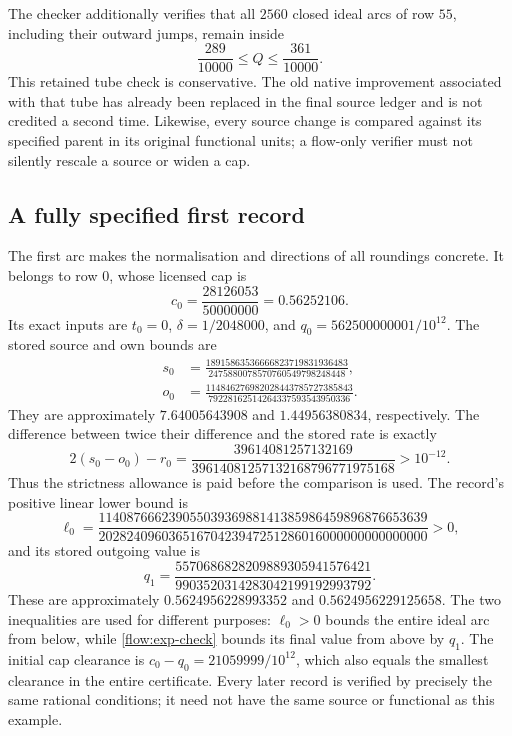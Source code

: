 \documentclass[11pt,a4paper]{article}
\theoremstyle{definition}
\theoremstyle{remark}
\begin{document}
The checker additionally verifies that all $2560$ closed ideal arcs of
row $55$, including their outward jumps, remain inside
\[
 \frac{289}{10000}\leq Q\leq\frac{361}{10000}.
\]
This retained tube check is conservative.  The old native improvement
associated with that tube has already been replaced in the final source
ledger and is not credited a second time.  Likewise, every source
change is compared against its specified parent in its original
functional units; a flow-only verifier must not silently rescale a source
or widen a cap.

\subsection{A fully specified first record}
\label{flow:first-record}

The first arc makes the normalisation and directions of all roundings
concrete.  It belongs to row $0$, whose licensed cap is
\[
 c_0=\frac{28126053}{50000000}=0.56252106.
\]
Its exact inputs are $t_0=0$, $\delta=1/2048000$, and
$q_0=562500000001/10^{12}$.  The stored source and own bounds are
\begin{align*}
 s_0&=\frac{18915863536666823719831936483}
 {2475880078570760549798248448},\\
 o_0&=\frac{114846276982028443785727385843}
 {79228162514264337593543950336}.
\end{align*}
They are approximately $7.64005643908$ and $1.44956380834$,
respectively.  The difference between twice their difference and the
stored rate is exactly
\[
 2(s_0-o_0)-r_0=
 \frac{39614081257132169}{39614081257132168796771975168}
 >10^{-12}.
\]
Thus the strictness allowance is paid before the comparison is used.
The record's positive linear lower bound is
\[
 \ell_0=
 \frac{11408766623905503936988141385986459896876653639}
 {20282409603651670423947251286016000000000000000}>0,
\]
and its stored outgoing value is
\[
 q_1=\frac{5570686828209889305941576421}
 {9903520314283042199192993792}.
\]
These are approximately $0.5624956228993352$ and
$0.5624956229125658$.  The two inequalities are used for different
purposes: $\ell_0>0$ bounds the entire ideal arc from below, while
\eqref{flow:exp-check} bounds its final value from above by $q_1$.
The initial cap clearance is
$c_0-q_0=21059999/10^{12}$, which also equals the smallest clearance
in the entire certificate.  Every later record is verified by precisely
the same rational conditions; it need not have the same source or
functional as this example.
\end{document}
